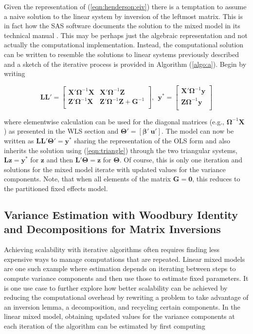 \documentclass[12pt]{article}
\begin{document}
Given the representation of (\ref{eqn:henderson:eiv}) there is a temptation to assume a naive solution to the linear system by inversion of the leftmost matrix. This is in fact how the SAS software documents the solution to the mixed model in its technical manual \cite{sas}. This may be perhaps just the algebraic representation and not actually the computational implementation. Instead, the computational solution can be written to resemble the solutions to linear systems previously described and a sketch of the iterative process is provided in Algorithm (\ref{algo:a}). Begin by writing 

\begin{equation}
\label{eqn:chol}
\bm{L}\bm{L}' = 
\left [ 
\begin{array}{cc}
\bm{X'}\bm{\Omega}^{-1}\bm{X}& \bm{X'}\bm{\Omega}^{-1}\bm{Z}\\
\bm{Z}'\bm{\Omega}^{-1}\bm{X} & \bm{Z}'\bm{\Omega}^{-1}\bm{Z} + \bm{G}^{-1}\\
\end{array}
\right], \ \ 
\bm{y}^* = 
\left [ 
\begin{array}{c}
\bm{X'}\bm{\Omega}^{-1}\bm{y} \\
\bm{Z}\bm{\Omega}^{-1}\bm{y}\\
\end{array}
\right]
\end{equation}

\noindent where elementwise calculation can be used for the diagonal matrices (e.g., $\bm{\Omega}^{-1}\bm{X}$ ) as presented in the WLS section and $\bm{\Theta}' = \left[\bm{\beta}' \ \bm{u}'\right]$. The model can now be written as $\bm{L}\bm{L}'\bm{\Theta}'=\bm{y}^*$ sharing the representation of the OLS form and also inherits the solution using (\ref{eqn:triangle}) through the two triangular systems, $\bm{L}\bm{z}  = \bm{y}^*$ for $\bm{z}$ and then $\bm{L}' \bm{\Theta}  = \bm{z}$ for $\bm{\Theta}$. Of course, this is only one iteration and solutions for the mixed model iterate with updated values for the variance components. Note, that when all elements of the matrix $\bm{G} = \bm{0}$, this reduces to the partitioned fixed effects model.

\subsection*{Variance Estimation with Woodbury Identity and Decompositions for Matrix Inversions}

Achieving scalability with iterative algorithms often requires finding less expensive ways to manage computations that are repeated. Linear mixed models are one such example where estimation depends on iterating between steps to compute variance components and then use those to estimate fixed parameters. It is one use case to further explore how better scalability can be achieved by reducing the computational overhead by rewriting a problem to take advantage of an inversion lemma, a decomposition, and recycling certain components. In the linear mixed model, obtaining updated values for the variance components at each iteration of the algorithm can be estimated by first computing \cite{mcandsearle:2001}
\end{document}
